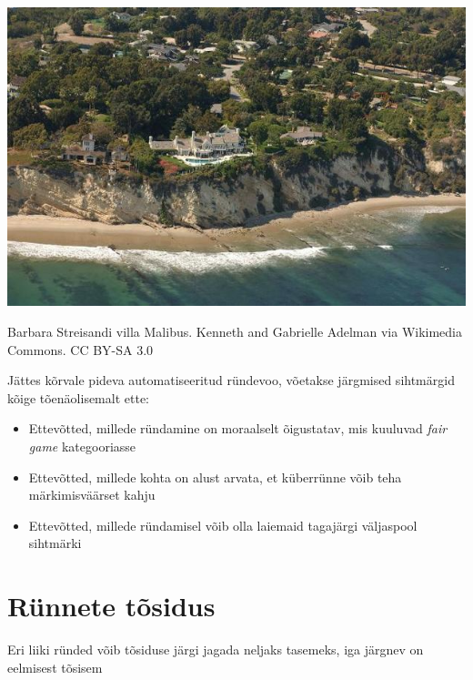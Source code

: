 \begin{marginfigure}
	\includegraphics[width=\linewidth]{barbrara.jpg}%
	\caption{Barbara Streisandi villa Malibus. Kenneth and Gabrielle Adelman via Wikimedia Commons. CC BY-SA 3.0} 
	\label{fig:barbara}
\end{marginfigure}

Jättes kõrvale pideva automatiseeritud ründevoo, võetakse järgmised sihtmärgid kõige tõenäolisemalt ette:
\begin{itemize}
	\item Ettevõtted, millede ründamine on moraalselt õigustatav, mis kuuluvad \emph{fair game} kategooriasse
	\item Ettevõtted, millede kohta on alust arvata, et küberrünne võib teha märkimisväärset kahju
	\item Ettevõtted, millede ründamisel võib olla laiemaid tagajärgi väljaspool sihtmärki
\end{itemize}

\section{Rünnete tõsidus}
Eri liiki ründed võib tõsiduse järgi jagada neljaks tasemeks, iga järgnev on eelmisest tõsisem

